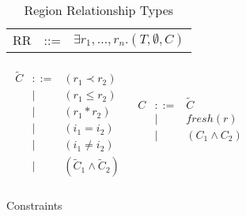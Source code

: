 \documentclass{article}
\newcommand{\rtriple}[3]{\left({#1},{#2},{#3}\right)}
\begin{document}
\begin{table*}
\centering
{\small
\begin{tabular}{ccc}
RR & ::= & $\exists r_1, \ldots, r_n.\rtriple{T}{\emptyset}{C}$ \\
\end{tabular}
}
\caption{Region Relationship Types}
\end{table*}



\begin{table*}
\centering
{\small
\begin{math}
\begin{array}{cc}
\begin{array}{ccc}
\widetilde{C} & ::= & (r_1 \prec r_2) \\
  &\mid&(r_1 \le r_2) \\
  &\mid&(r_1 * r_2) \\
  &\mid&(i_1 = i_2) \\
  &\mid&(i_1 \ne i_2) \\
  &\mid&(\widetilde{C}_1 \wedge \widetilde{C}_2) \\
\end{array} &
\begin{array}{ccc}
C & ::= & \widetilde{C} \\
  &\mid&fresh(r) \\
  &\mid&(C_1 \wedge C_2) \\ { } \\ { } \\
\end{array}
\end{array}
\end{math}
}
\caption{Constraints}
\end{table*}
\end{document}
